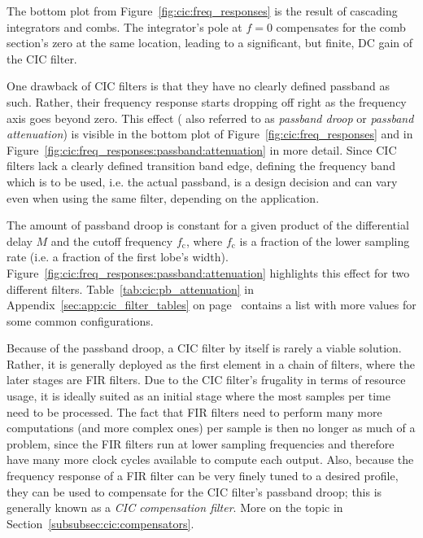 The  bottom plot  from  Figure~\ref{fig:cic:freq_responses} is  the result  of
cascading integrators and combs.  The integrator's pole at $f = 0$ compensates
for the  comb section's zero at  the same location, leading  to a significant,
but finite, DC gain of the CIC filter.

One  drawback   of  CIC  filters  is   that  they  have  no   clearly  defined
passband  as  such. Rather,  their  frequency  response  starts  dropping  off
right  as   the  frequency   axis  goes  beyond   zero. This  effect   (  also
referred  to  as  \emph{passband  droop} or  \emph{passband  attenuation})  is
visible  in  the bottom  plot  of  Figure~\ref{fig:cic:freq_responses} and  in
Figure~\ref{fig:cic:freq_responses:passband:attenuation} in more detail. Since
CIC  filters  lack  a  clearly  defined transition  band  edge,  defining  the
frequency band  which is  to be used,  i.e. the actual  passband, is  a design
decision  and can  vary even  when  using the  same filter,  depending on  the
application.

The   amount   of  passband   droop   is   constant   for  a   given   product
of    the    differential    delay    $M$    and    the    cutoff    frequency
$f_\mathrm{c}$,    where    $f_\mathrm{c}$    is    a    fraction    of    the
lower   sampling    rate   (i.e.    a   fraction    of   the    first   lobe's
width). Figure~\ref{fig:cic:freq_responses:passband:attenuation}    highlights
this  effect  for  two  different  filters. Table~\ref{tab:cic:pb_attenuation}
in                 Appendix~\ref{sec:app:cic_filter_tables}                 on
page~\pageref{tab:cic:pb_attenuation}  contains a  list with  more values  for
some common configurations.

Because of  the passband  droop, a  CIC filter  by itself  is rarely  a viable
solution. Rather, it is generally deployed as  the first element in a chain of
filters,  where the  later stages  are FIR  filters. Due to  the CIC  filter's
frugality in terms of resource usage, it is ideally suited as an initial stage
where  the most  samples per  time  need to  be processed. The  fact that  FIR
filters need  to perform many  more computations  (and more complex  ones) per
sample is  then no  longer as  much of a  problem, since  the FIR  filters run
at  lower sampling  frequencies  and  therefore have  many  more clock  cycles
available  to  compute  each  output. Also,  because  the  frequency  response
of  a  FIR  filter can  be  very  finely  tuned  to a  desired  profile,  they
can  be used  to  compensate for  the  CIC filter's  passband  droop; this  is
generally  known as  a \emph{CIC  compensation filter}. More  on the  topic in
Section~\ref{subsubsec:cic:compensators}.

